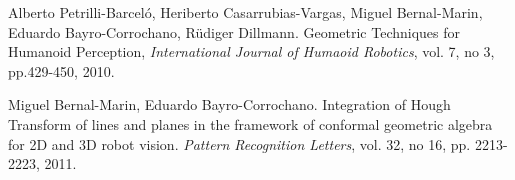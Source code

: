 
\begin{bibsection}
  \item Alberto Petrilli-Barceló, Heriberto Casarrubias-Vargas,
        Miguel Bernal-Marin, Eduardo Bayro-Corrochano, R{\"u}diger Dillmann.
        Geometric Techniques for Humanoid Perception,
        \emph{International Journal of Humaoid Robotics},
        vol. 7, no 3, pp.429-450, 2010.

  \item Miguel Bernal-Marin, Eduardo Bayro-Corrochano.
        Integration of Hough Transform of lines and planes in the
        framework of conformal geometric algebra for 2D and 3D robot vision.
        \emph{Pattern Recognition Letters},
        vol. 32, no 16, pp. 2213-2223, 2011.
\end{bibsection}

